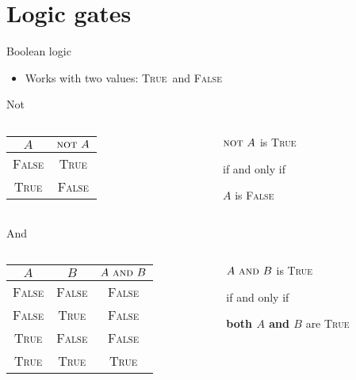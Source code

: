 \part{Logic gates}
\frame{\partpage}

\newcommand{\TT}{\textsc{True}}
\newcommand{\FF}{\textsc{False}}
\newcommand{\OP}[1]{\ \textsc{#1}\ }
\newcommand{\OPand}{\OP{and}}
\newcommand{\OPor}{\OP{or}}
\newcommand{\OPxor}{\OP{xor}}
\newcommand{\OPnot}{\textsc{not}\ }

\begin{frame}{Boolean logic}
	\begin{itemize}
		\item Works with two values: \TT\ and \FF
	\end{itemize}
\end{frame}

\begin{frame}{Not}
	\begin{columns}
		\begin{column}{0.4\textwidth}
			\centering
			\begin{tabular}{|c||c|}
				\hline
				$A$ & $\OPnot A$ \\\hline
				\FF & \TT \\
				\TT & \FF \\\hline
			\end{tabular}
		\end{column}
		\begin{column}{0.5\textwidth}
			\centering
			$\OPnot A$ is \TT
			
			if and only if
			
			\textbf{$A$} is \FF
		\end{column}
	\end{columns}
\end{frame}

\begin{frame}{And}
	\begin{columns}
		\begin{column}{0.4\textwidth}
			\centering
			\begin{tabular}{|c|c||c|}
				\hline
				$A$ & $B$ & $A \OPand B$ \\\hline
				\FF & \FF & \FF \\
				\FF & \TT & \FF \\
				\TT & \FF & \FF \\
				\TT & \TT & \TT \\\hline
			\end{tabular}
		\end{column}
		\begin{column}{0.5\textwidth}
			\centering
			$A \OPand B$ is \TT
			
			if and only if
			
			\textbf{both $A$ and $B$} are \TT
		\end{column}
	\end{columns}
\end{frame}

